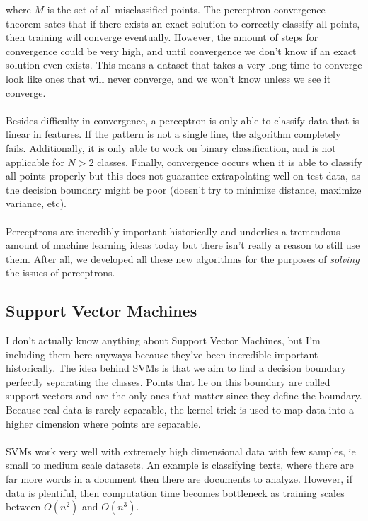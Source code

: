 \documentclass[11pt]{article}
\begin{document}
\noindent where \( M \) is the set of all misclassified points. The perceptron convergence theorem sates that if there exists an exact solution to correctly classify all points, then
training will converge eventually. However, the amount of steps for convergence could be very high, and until convergence we don't know if an exact solution even exists. This means
a dataset that takes a very long time to converge look like ones that will never converge, and we won't know unless we see it converge.
\\
\\
\noindent Besides difficulty in convergence, a perceptron is only able to classify data that is linear in features. If the pattern is not a single line, the algorithm completely fails. 
Additionally, it is only able to work on binary classification, and is not applicable for \( N > 2 \) classes. Finally, convergence occurs when it is able to classify all points properly
but this does not guarantee extrapolating well on test data, as the decision boundary might be poor (doesn't try to minimize distance, maximize variance, etc).
\\
\\
\noindent Perceptrons are incredibly important historically and underlies a tremendous amount of machine learning ideas today but there isn't really a reason to still use them. After all,
we developed all these new algorithms for the purposes of \textit{solving} the issues of perceptrons.

\subsection{Support Vector Machines}
I don't actually know anything about Support Vector Machines, but I'm including them here anyways because they've been incredible important historically. The idea behind SVMs is that we aim to
find a decision boundary perfectly separating the classes. Points that lie on this boundary are called support vectors and are the only ones that matter since they define the boundary. Because
real data is rarely separable, the kernel trick is used to map data into a higher dimension where points are separable.
\\
\\
\noindent SVMs work very well with extremely high dimensional data with few samples, ie small to medium scale datasets. An example is classifying texts, where there are far more words in a document
then there are documents to analyze. However, if data is plentiful, then computation time becomes bottleneck as training scales between \( O(n^{2}) \) and \( O(n^{3}) \).
\end{document}
